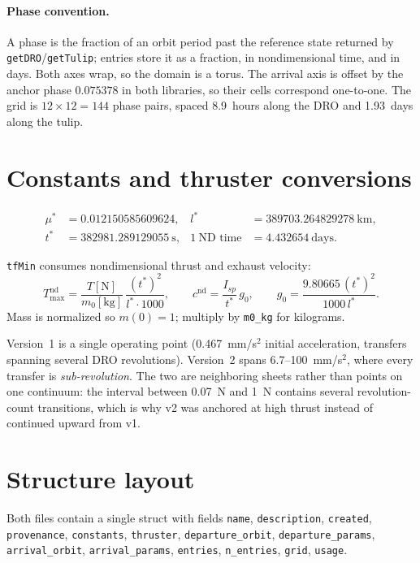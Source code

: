 \documentclass[11pt]{article}
\begin{document}
\paragraph{Phase convention.} A phase is the fraction of an orbit period past
the reference state returned by \texttt{getDRO}/\texttt{getTulip}; entries
store it as a fraction, in nondimensional time, and in days. Both axes wrap,
so the domain is a torus. The arrival axis is offset by the anchor phase
$0.075378$ in both libraries, so their cells correspond one-to-one. The grid
is $12 \times 12 = 144$ phase pairs, spaced 8.9~hours along the DRO and
1.93~days along the tulip.

\section{Constants and thruster conversions}

\begin{align}
\mu^\ast &= 0.012150585609624, &
l^\ast &= 389703.264829278~\text{km}, \\
t^\ast &= 382981.289129055~\text{s}, &
1~\text{ND time} &= 4.432654~\text{days}.
\end{align}

\texttt{tfMin} consumes nondimensional thrust and exhaust velocity:
\begin{equation}
T_{\max}^{\text{nd}} = \frac{T[\mathrm{N}]}{m_0[\mathrm{kg}]}\,
\frac{(t^\ast)^2}{l^\ast \cdot 1000},
\qquad
c^{\text{nd}} = \frac{I_{sp}}{t^\ast}\,g_0,
\qquad
g_0 = \frac{9.80665\,(t^\ast)^2}{1000\,l^\ast}.
\end{equation}
Mass is normalized so $m(0)=1$; multiply by \texttt{m0\_kg} for kilograms.

Version~1 is a single operating point (0.467~mm/s$^2$ initial acceleration,
transfers spanning several DRO revolutions). Version~2 spans
6.7--100~mm/s$^2$, where every transfer is \emph{sub-revolution}. The two are
neighboring sheets rather than points on one continuum: the interval between
0.07~N and 1~N contains several revolution-count transitions, which is why v2
was anchored at high thrust instead of continued upward from v1.

\section{Structure layout}

Both files contain a single struct with fields \texttt{name},
\texttt{description}, \texttt{created}, \texttt{provenance},
\texttt{constants}, \texttt{thruster}, \texttt{departure\_orbit},
\texttt{departure\_params}, \texttt{arrival\_orbit}, \texttt{arrival\_params},
\texttt{entries}, \texttt{n\_entries}, \texttt{grid}, \texttt{usage}.
\end{document}
